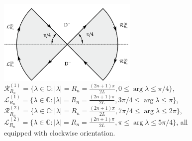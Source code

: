 \documentclass[12pt]{article}
\numberwithin{equation}{section}
\begin{document}
\begin{figure}[h]
    \centering 
    \includegraphics[width=0.60\textwidth]{Fokas 2.5.1.pdf}
    \caption{$\mathcal{R}^{(1)}_{R_n}=\{\lambda\in\mathbb{C}:\vert\lambda\vert=R_n=\frac{(2n+1)\pi}{2L},0\leqslant\arg{\lambda}\leqslant\pi/4\}$, $\mathcal{L}^{(1)}_{R_n}=\{\lambda\in\mathbb{C}:\vert\lambda\vert=R_n=\frac{(2n+1)\pi}{2L},3\pi/4\leqslant\arg{\lambda}\leqslant\pi\}$, $\mathcal{R}^{(2)}_{R_n}=\{\lambda\in\mathbb{C}:\vert\lambda\vert=R_n=\frac{(2n+1)\pi}{2L},7\pi/4\leqslant\arg{\lambda}\leqslant 2\pi\}$, $\mathcal{L}^{(2)}_{R_n}=\{\lambda\in\mathbb{C}:\vert\lambda\vert=R_n=\frac{(2n+1)\pi}{2L},\pi\leqslant\arg{\lambda}\leqslant 5\pi/4\}$, all equipped with clockwise orientation.}
    \label{5}
\end{figure}
\end{document}

